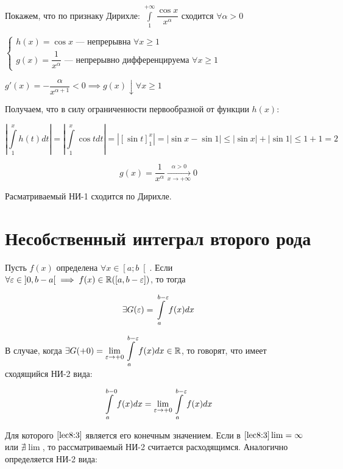 \documentclass[../../main.tex]{subfiles}
\begin{document}
\begin{exmp}
 Покажем, что по признаку Дирихле: 
 $\displaystyle\int\limits_{1}^{+\infty}\dfrac{\cos{x}}{x^{\alpha}}$ сходится 
 $\forall \alpha > 0$
 
 $\begin{cases}
 h(x) = \cos{x} \text{~--- непрерывна } \forall x \geq 1\\
 g(x) = \dfrac{1}{x^{\alpha}} \text{~--- непрерывно дифференцируема } \forall 
 x \geq 1
 \end{cases}$
 
 $g'(x) = -\dfrac{\alpha}{x^{\alpha + 1}} < 0 \implies g(x) \downarrow \forall 
 x \geq 1$
 
 Получаем, что в силу ограниченности первообразной от функции $h(x)$:
 
 \[\left| \int\limits_{1}^{x}h(t)dt\right| = 
 \left|\int\limits_{1}^{x}\cos{t}dt\right| = \left| \left[ 
 \sin{t}\right]_{1}^{x} \right| = \left| \sin{x} - \sin{1} \right| \leq \left| 
 \sin{x} \right| + \left| \sin{1} \right| \leq 1 + 1 = 2\]
 
 \[g(x) = \dfrac{1}{x^{\alpha}} \xrightarrow[x \to +\infty]{\alpha > 0} 0\]
 
 Расматриваемый НИ-1 сходится по Дирихле.
 \end{exmp}
 
 \section{Несобственный интеграл второго рода}
 
 Пусть $f(x)$ определена $\forall x \in \left[a; b \right[$. Если $\forall 
 \varepsilon \in \left] 0, b - a \right[ \implies f(x) \in \mathbb{R}(\left[a, b - 
 \varepsilon\right])$, то тогда

\begin{equation}\label{lec8:2}
\exists G(\varepsilon) = \displaystyle\int\limits_{a}^{b - \varepsilon}f(x)dx 
\end{equation}

В случае, когда $\exists G(+0) = \underset{\varepsilon \to +0}\lim 
\displaystyle\int\limits_{a}^{b - \varepsilon}f(x)dx \in \mathbb{R}$, то говорят, что имеет 
сходящийся НИ-2 вида:

\begin{equation}\label{lec8:3}
\displaystyle\int\limits_{a}^{b - 0}f(x)dx = \underset{\varepsilon \to +0}\lim 
\displaystyle\int\limits_{a}^{b - \varepsilon}f(x)dx
\end{equation}

Для которого $\eqref{lec8:3}$ является его конечным значением. Если в 
$\eqref{lec8:3} \lim = \infty$ или $\nexists \lim$, то рассматриваемый НИ-2 
считается расходящимся. Аналогично определяется НИ-2 вида:
\end{document}
